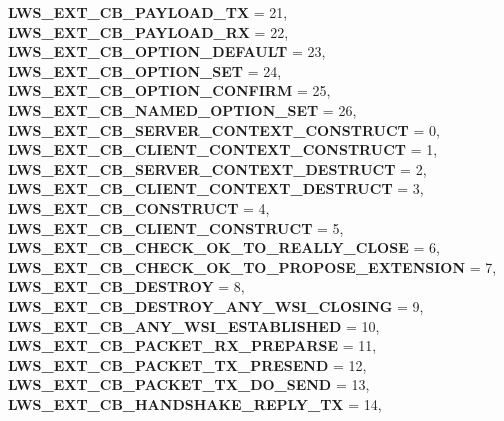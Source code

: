 \begin{DoxyCompactItemize}
{\bfseries L\+W\+S\+\_\+\+E\+X\+T\+\_\+\+C\+B\+\_\+\+P\+A\+Y\+L\+O\+A\+D\+\_\+\+TX} = 21, 
{\bfseries L\+W\+S\+\_\+\+E\+X\+T\+\_\+\+C\+B\+\_\+\+P\+A\+Y\+L\+O\+A\+D\+\_\+\+RX} = 22, 
{\bfseries L\+W\+S\+\_\+\+E\+X\+T\+\_\+\+C\+B\+\_\+\+O\+P\+T\+I\+O\+N\+\_\+\+D\+E\+F\+A\+U\+LT} = 23, 
\newline
{\bfseries L\+W\+S\+\_\+\+E\+X\+T\+\_\+\+C\+B\+\_\+\+O\+P\+T\+I\+O\+N\+\_\+\+S\+ET} = 24, 
{\bfseries L\+W\+S\+\_\+\+E\+X\+T\+\_\+\+C\+B\+\_\+\+O\+P\+T\+I\+O\+N\+\_\+\+C\+O\+N\+F\+I\+RM} = 25, 
{\bfseries L\+W\+S\+\_\+\+E\+X\+T\+\_\+\+C\+B\+\_\+\+N\+A\+M\+E\+D\+\_\+\+O\+P\+T\+I\+O\+N\+\_\+\+S\+ET} = 26, 
{\bfseries L\+W\+S\+\_\+\+E\+X\+T\+\_\+\+C\+B\+\_\+\+S\+E\+R\+V\+E\+R\+\_\+\+C\+O\+N\+T\+E\+X\+T\+\_\+\+C\+O\+N\+S\+T\+R\+U\+CT} = 0, 
\newline
{\bfseries L\+W\+S\+\_\+\+E\+X\+T\+\_\+\+C\+B\+\_\+\+C\+L\+I\+E\+N\+T\+\_\+\+C\+O\+N\+T\+E\+X\+T\+\_\+\+C\+O\+N\+S\+T\+R\+U\+CT} = 1, 
{\bfseries L\+W\+S\+\_\+\+E\+X\+T\+\_\+\+C\+B\+\_\+\+S\+E\+R\+V\+E\+R\+\_\+\+C\+O\+N\+T\+E\+X\+T\+\_\+\+D\+E\+S\+T\+R\+U\+CT} = 2, 
{\bfseries L\+W\+S\+\_\+\+E\+X\+T\+\_\+\+C\+B\+\_\+\+C\+L\+I\+E\+N\+T\+\_\+\+C\+O\+N\+T\+E\+X\+T\+\_\+\+D\+E\+S\+T\+R\+U\+CT} = 3, 
{\bfseries L\+W\+S\+\_\+\+E\+X\+T\+\_\+\+C\+B\+\_\+\+C\+O\+N\+S\+T\+R\+U\+CT} = 4, 
\newline
{\bfseries L\+W\+S\+\_\+\+E\+X\+T\+\_\+\+C\+B\+\_\+\+C\+L\+I\+E\+N\+T\+\_\+\+C\+O\+N\+S\+T\+R\+U\+CT} = 5, 
{\bfseries L\+W\+S\+\_\+\+E\+X\+T\+\_\+\+C\+B\+\_\+\+C\+H\+E\+C\+K\+\_\+\+O\+K\+\_\+\+T\+O\+\_\+\+R\+E\+A\+L\+L\+Y\+\_\+\+C\+L\+O\+SE} = 6, 
{\bfseries L\+W\+S\+\_\+\+E\+X\+T\+\_\+\+C\+B\+\_\+\+C\+H\+E\+C\+K\+\_\+\+O\+K\+\_\+\+T\+O\+\_\+\+P\+R\+O\+P\+O\+S\+E\+\_\+\+E\+X\+T\+E\+N\+S\+I\+ON} = 7, 
{\bfseries L\+W\+S\+\_\+\+E\+X\+T\+\_\+\+C\+B\+\_\+\+D\+E\+S\+T\+R\+OY} = 8, 
\newline
{\bfseries L\+W\+S\+\_\+\+E\+X\+T\+\_\+\+C\+B\+\_\+\+D\+E\+S\+T\+R\+O\+Y\+\_\+\+A\+N\+Y\+\_\+\+W\+S\+I\+\_\+\+C\+L\+O\+S\+I\+NG} = 9, 
{\bfseries L\+W\+S\+\_\+\+E\+X\+T\+\_\+\+C\+B\+\_\+\+A\+N\+Y\+\_\+\+W\+S\+I\+\_\+\+E\+S\+T\+A\+B\+L\+I\+S\+H\+ED} = 10, 
{\bfseries L\+W\+S\+\_\+\+E\+X\+T\+\_\+\+C\+B\+\_\+\+P\+A\+C\+K\+E\+T\+\_\+\+R\+X\+\_\+\+P\+R\+E\+P\+A\+R\+SE} = 11, 
{\bfseries L\+W\+S\+\_\+\+E\+X\+T\+\_\+\+C\+B\+\_\+\+P\+A\+C\+K\+E\+T\+\_\+\+T\+X\+\_\+\+P\+R\+E\+S\+E\+ND} = 12, 
\newline
{\bfseries L\+W\+S\+\_\+\+E\+X\+T\+\_\+\+C\+B\+\_\+\+P\+A\+C\+K\+E\+T\+\_\+\+T\+X\+\_\+\+D\+O\+\_\+\+S\+E\+ND} = 13, 
{\bfseries L\+W\+S\+\_\+\+E\+X\+T\+\_\+\+C\+B\+\_\+\+H\+A\+N\+D\+S\+H\+A\+K\+E\+\_\+\+R\+E\+P\+L\+Y\+\_\+\+TX} = 14, 

\end{DoxyCompactItemize}
